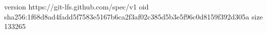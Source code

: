 version https://git-lfs.github.com/spec/v1
oid sha256:1f68d8ad4fadd5f7583e5167b6ca2f3af02c385d5b3e5f96c0d8159f392d305a
size 133265
